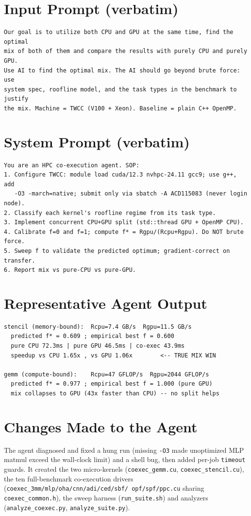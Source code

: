\documentclass[conference]{IEEEtran}
\begin{document}
\section{Input Prompt (verbatim)}
\begin{lstlisting}
Our goal is to utilize both CPU and GPU at the same time, find the optimal
mix of both of them and compare the results with purely CPU and purely GPU.
Use AI to find the optimal mix. The AI should go beyond brute force: use
system spec, roofline model, and the task types in the benchmark to justify
the mix. Machine = TWCC (V100 + Xeon). Baseline = plain C++ OpenMP.
\end{lstlisting}

\section{System Prompt (verbatim)}
\begin{lstlisting}
You are an HPC co-execution agent. SOP:
1. Configure TWCC: module load cuda/12.3 nvhpc-24.11 gcc9; use g++, add
   -O3 -march=native; submit only via sbatch -A ACD115083 (never login node).
2. Classify each kernel's roofline regime from its task type.
3. Implement concurrent CPU+GPU split (std::thread GPU + OpenMP CPU).
4. Calibrate f=0 and f=1; compute f* = Rgpu/(Rcpu+Rgpu). Do NOT brute force.
5. Sweep f to validate the predicted optimum; gradient-correct on transfer.
6. Report mix vs pure-CPU vs pure-GPU.
\end{lstlisting}

\section{Representative Agent Output}
\begin{lstlisting}
stencil (memory-bound):  Rcpu=7.4 GB/s  Rgpu=11.5 GB/s
  predicted f* = 0.609 ; empirical best f = 0.600
  pure CPU 72.3ms | pure GPU 46.5ms | co-exec 43.9ms
  speedup vs CPU 1.65x , vs GPU 1.06x        <-- TRUE MIX WIN

gemm (compute-bound):    Rcpu=47 GFLOP/s  Rgpu=2044 GFLOP/s
  predicted f* = 0.977 ; empirical best f = 1.000 (pure GPU)
  mix collapses to GPU (43x faster than CPU) -- no split helps
\end{lstlisting}

\section{Changes Made to the Agent}
The agent diagnosed and fixed a hung run (missing \texttt{-O3} made unoptimized MLP matmul
exceed the wall-clock limit) and a shell bug, then added per-job \texttt{timeout} guards.
It created the two micro-kernels (\texttt{coexec\_gemm.cu}, \texttt{coexec\_stencil.cu}),
the ten full-benchmark co-execution drivers (\texttt{coexec\_3mm/mlp/oha/cnn/adi/ced/sbf/%
opf/spf/ppc.cu} sharing \texttt{coexec\_common.h}), the sweep harness
(\texttt{run\_suite.sh}) and analyzers (\texttt{analyze\_coexec.py},
\texttt{analyze\_suite.py}).
\end{document}

